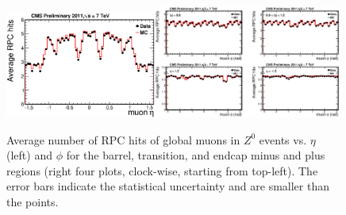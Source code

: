 \documentclass{JINST}
\begin{document}
\begin{figure}
  \begin{center}
    \texttt{\includegraphics[width=0.44\textwidth]{AveHitVsEta_STA}}\hspace{0.15cm}\texttt{\includegraphics[width=0.55\textwidth]{AveHitVsPhi_STA}}
    \caption{
    Average number of RPC hits of global muons in $Z^{0}$ events vs. $\eta$ (left) and $\phi$ for the barrel, transition, and endcap minus and plus regions (right four plots, clock-wise, starting from top-left).  The error bars indicate the statistical uncertainty and are smaller than the points.
    }
    \label{fig:fraction_STA}
  \end{center}
\end{figure}
\end{document}
